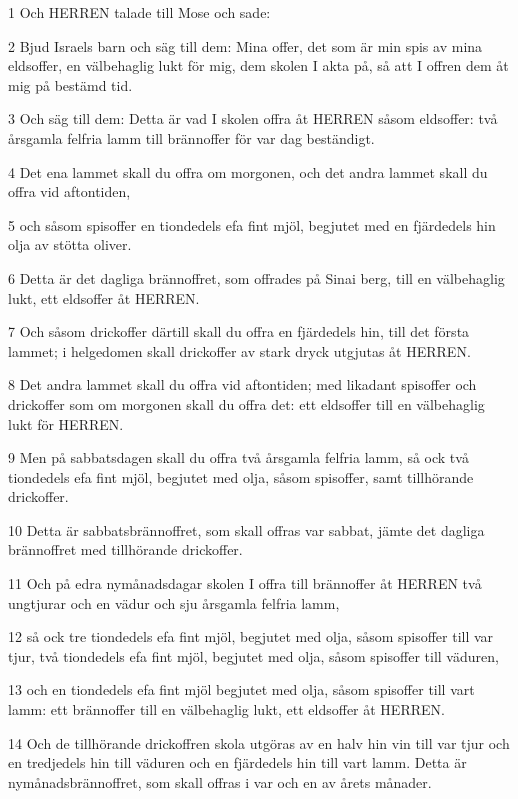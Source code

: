 \par 1 Och HERREN talade till Mose och sade:
\par 2 Bjud Israels barn och säg till dem: Mina offer, det som är min spis av mina eldsoffer, en välbehaglig lukt för mig, dem skolen I akta på, så att I offren dem åt mig på bestämd tid.
\par 3 Och säg till dem: Detta är vad I skolen offra åt HERREN såsom eldsoffer: två årsgamla felfria lamm till brännoffer för var dag beständigt.
\par 4 Det ena lammet skall du offra om morgonen, och det andra lammet skall du offra vid aftontiden,
\par 5 och såsom spisoffer en tiondedels efa fint mjöl, begjutet med en fjärdedels hin olja av stötta oliver.
\par 6 Detta är det dagliga brännoffret, som offrades på Sinai berg, till en välbehaglig lukt, ett eldsoffer åt HERREN.
\par 7 Och såsom drickoffer därtill skall du offra en fjärdedels hin, till det första lammet; i helgedomen skall drickoffer av stark dryck utgjutas åt HERREN.
\par 8 Det andra lammet skall du offra vid aftontiden; med likadant spisoffer och drickoffer som om morgonen skall du offra det: ett eldsoffer till en välbehaglig lukt för HERREN.
\par 9 Men på sabbatsdagen skall du offra två årsgamla felfria lamm, så ock två tiondedels efa fint mjöl, begjutet med olja, såsom spisoffer, samt tillhörande drickoffer.
\par 10 Detta är sabbatsbrännoffret, som skall offras var sabbat, jämte det dagliga brännoffret med tillhörande drickoffer.
\par 11 Och på edra nymånadsdagar skolen I offra till brännoffer åt HERREN två ungtjurar och en vädur och sju årsgamla felfria lamm,
\par 12 så ock tre tiondedels efa fint mjöl, begjutet med olja, såsom spisoffer till var tjur, två tiondedels efa fint mjöl, begjutet med olja, såsom spisoffer till väduren,
\par 13 och en tiondedels efa fint mjöl begjutet med olja, såsom spisoffer till vart lamm: ett brännoffer till en välbehaglig lukt, ett eldsoffer åt HERREN.
\par 14 Och de tillhörande drickoffren skola utgöras av en halv hin vin till var tjur och en tredjedels hin till väduren och en fjärdedels hin till vart lamm. Detta är nymånadsbrännoffret, som skall offras i var och en av årets månader.
